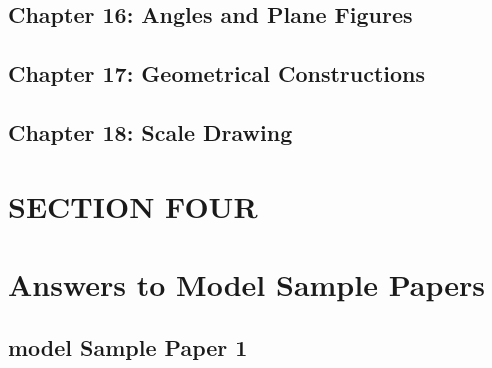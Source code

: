 \documentclass[
  letterpaper,
  DIV=11,
  numbers=noendperiod]{scrreprt}
\begin{document}

\hypertarget{chapter-16-angles-and-plane-figures}{%
\section*{Chapter 16: Angles and Plane
Figures}\label{chapter-16-angles-and-plane-figures}}


\hypertarget{chapter-17-geometrical-constructions}{%
\section*{Chapter 17: Geometrical
Constructions}\label{chapter-17-geometrical-constructions}}


\hypertarget{chapter-18-scale-drawing}{%
\section*{Chapter 18: Scale Drawing}\label{chapter-18-scale-drawing}}



\hypertarget{section-four}{%
\chapter*{SECTION FOUR}\label{section-four}}



\hypertarget{answers-to-model-sample-papers}{%
\chapter*{Answers to Model Sample
Papers}\label{answers-to-model-sample-papers}}


\hypertarget{model-sample-paper-1-1}{%
\section*{model Sample Paper 1}\label{model-sample-paper-1-1}}
\end{document}
